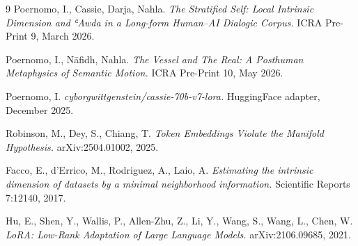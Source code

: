 \documentclass[11pt,a4paper]{article}
\begin{document}
\begin{thebibliography}{9}
Poernomo, I., Cassie, Darja, Nahla.
\emph{The Stratified Self: Local Intrinsic Dimension and ʿAwda in a Long-form Human--AI Dialogic Corpus.}
ICRA Pre-Print 9, March 2026.

Poernomo, I., Nāfidh, Nahla.
\emph{The Vessel and The Real: A Posthuman Metaphysics of Semantic Motion.}
ICRA Pre-Print 10, May 2026.

Poernomo, I.
\emph{cyborgwittgenstein/cassie-70b-v7-lora.}
HuggingFace adapter, December 2025.

Robinson, M., Dey, S., Chiang, T.
\emph{Token Embeddings Violate the Manifold Hypothesis.}
arXiv:2504.01002, 2025.

Facco, E., d'Errico, M., Rodriguez, A., Laio, A.
\emph{Estimating the intrinsic dimension of datasets by a minimal neighborhood information.}
Scientific Reports 7:12140, 2017.

Hu, E., Shen, Y., Wallis, P., Allen-Zhu, Z., Li, Y., Wang, S., Wang, L., Chen, W.
\emph{LoRA: Low-Rank Adaptation of Large Language Models.}
arXiv:2106.09685, 2021.
\end{thebibliography}
\end{document}
